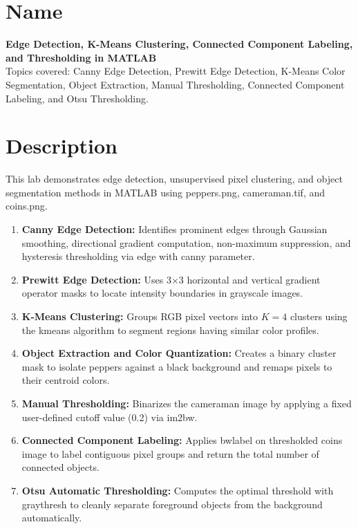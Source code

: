 \documentclass[12pt,a4paper]{article}
\begin{document}

\section{Name}

\textbf{Edge Detection, K-Means Clustering, Connected Component Labeling, and Thresholding in MATLAB}\\[0.3em]
Topics covered: Canny Edge Detection, Prewitt Edge Detection, K-Means Color Segmentation, Object Extraction, Manual Thresholding, Connected Component Labeling, and Otsu Thresholding.


\section{Description}

This lab demonstrates edge detection, unsupervised pixel clustering, and object segmentation methods in MATLAB using peppers.png, cameraman.tif, and coins.png.

\begin{enumerate}
  \item \textbf{Canny Edge Detection:} Identifies prominent edges through Gaussian smoothing, directional gradient computation, non-maximum suppression, and hysteresis thresholding via edge with canny parameter.

  \item \textbf{Prewitt Edge Detection:} Uses 3$\times$3 horizontal and vertical gradient operator masks to locate intensity boundaries in grayscale images.

  \item \textbf{K-Means Clustering:} Groups RGB pixel vectors into $K = 4$ clusters using the kmeans algorithm to segment regions having similar color profiles.

  \item \textbf{Object Extraction and Color Quantization:} Creates a binary cluster mask to isolate peppers against a black background and remaps pixels to their centroid colors.

  \item \textbf{Manual Thresholding:} Binarizes the cameraman image by applying a fixed user-defined cutoff value (0.2) via im2bw.

  \item \textbf{Connected Component Labeling:} Applies bwlabel on thresholded coins image to label contiguous pixel groups and return the total number of connected objects.

  \item \textbf{Otsu Automatic Thresholding:} Computes the optimal threshold with graythresh to cleanly separate foreground objects from the background automatically.
\end{enumerate}
\end{document}
